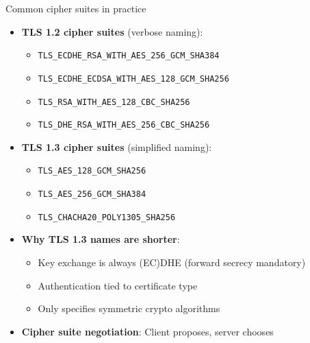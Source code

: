 \documentclass[aspectratio=169, lualatex, handout]{beamer}
\begin{document}
\begin{frame}{Common cipher suites in practice}
	\begin{itemize}
		\item \textbf{TLS 1.2 cipher suites} (verbose naming):
		      \begin{itemize}
			      \item \texttt{TLS\_ECDHE\_RSA\_WITH\_AES\_256\_GCM\_SHA384}
			      \item \texttt{TLS\_ECDHE\_ECDSA\_WITH\_AES\_128\_GCM\_SHA256}
			      \item \texttt{TLS\_RSA\_WITH\_AES\_128\_CBC\_SHA256}
			      \item \texttt{TLS\_DHE\_RSA\_WITH\_AES\_256\_CBC\_SHA256}
		      \end{itemize}
		\item \textbf{TLS 1.3 cipher suites} (simplified naming):
		      \begin{itemize}
			      \item \texttt{TLS\_AES\_128\_GCM\_SHA256}
			      \item \texttt{TLS\_AES\_256\_GCM\_SHA384}
			      \item \texttt{TLS\_CHACHA20\_POLY1305\_SHA256}
		      \end{itemize}
		\item \textbf{Why TLS 1.3 names are shorter}:
		      \begin{itemize}
			      \item Key exchange is always (EC)DHE (forward secrecy mandatory)
			      \item Authentication tied to certificate type
			      \item Only specifies symmetric crypto algorithms
		      \end{itemize}
		\item \textbf{Cipher suite negotiation}: Client proposes, server chooses
	\end{itemize}
\end{frame}
\end{document}
